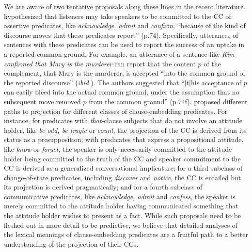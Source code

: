 \documentclass[11pt,fleqn]{article}
\newcommand{\6}{\mbox{$[\hspace*{-.6mm}[$}}
\newcommand{\9}{\mbox{$]\hspace*{-.6mm}]$}}
\begin{document}
We are aware of two tentative proposals along these lines in the recent literature. \citet{anand-hacquard2014} hypothesized that listeners may take speakers to be committed to the CC of assertive predicates, like {\em acknowledge, admit} and {\em confirm},  ``because of the kind of discourse moves that these predicates report'' (p.74). Specifically, utterances of sentences with these predicates can be used to report the success of an uptake in a reported common ground. For example, an utterance of a sentence like {\em Kim confirmed that Mary is the murderer} can report that the content $p$ of the  complement, that Mary is the murderer, is accepted ``into the common ground of the reported discourse'' ({\em ibid.}). The authors suggested that ``[t]his acceptance of $p$ can easily bleed into the actual common ground, under the assumption that no subsequent move removed $p$ from the common ground'' (p.74f). \citet{karttunen2016}  proposed different paths to projection for different classes of clause-embedding predicates. For instance, for predicates with {\em that-}clause subjects that do not involve an attitude holder, like {\em be odd, be tragic} or {\em count}, the projection of the CC is derived from its status as a presupposition; with predicates that express a propositional attitude, like {\em know} or {\em forget}, the speaker is only necessarily committed to the attitude holder being committed to the truth of the CC and speaker commitment to the CC is derived as a generalized conversational implicature; for a third subclass of change-of-state predicates, including {\em discover} and {\em notice}, the CC is entailed but its projection is derived pragmatically; and for a fourth subclass of communicative predicates, like {\em acknowledge, admit} and {\em confess}, the speaker is merely committed to the attitude holder having communicated something that the attitude holder wishes to present as a fact. While such proposals need to be fleshed out in more detail to be predictive, we believe that detailed analyses of the lexical meanings of clause-embedding predicates are a fruitful path to a better understanding of the projection of their CCs.
\end{document}
